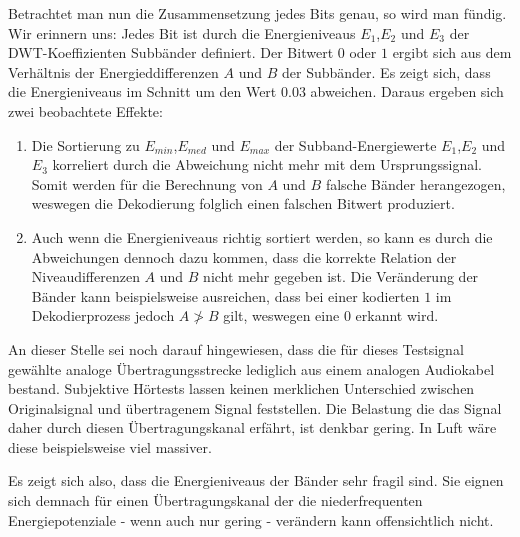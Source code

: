 Betrachtet man nun die Zusammensetzung jedes Bits genau, so wird man fündig. Wir erinnern uns: Jedes Bit ist durch die Energieniveaus ${E}_{1}$,${E}_{2}$ und ${E}_{3}$ der DWT-Koeffizienten Subbänder definiert. Der Bitwert $0$ oder $1$ ergibt sich aus dem Verhältnis der Energieddifferenzen $A$ und $B$ der Subbänder. Es zeigt sich, dass die Energieniveaus im Schnitt um den Wert $0.03$ abweichen. Daraus ergeben sich zwei beobachtete Effekte:

\begin{enumerate}
		
\item Die Sortierung zu ${E}_{min}$,${E}_{med}$ und ${E}_{max}$ der Subband-Energiewerte ${E}_{1}$,${E}_{2}$ und ${E}_{3}$ korreliert durch die Abweichung nicht mehr mit dem Ursprungssignal. Somit werden für die Berechnung von $A$ und $B$ falsche Bänder herangezogen, weswegen die Dekodierung folglich einen falschen Bitwert produziert. 
	
\item Auch wenn die Energieniveaus richtig sortiert werden, so kann es durch die Abweichungen dennoch dazu kommen, dass die korrekte Relation der Niveaudifferenzen $A$ und $B$ nicht mehr gegeben ist. Die Veränderung der Bänder kann beispielsweise ausreichen, dass bei einer kodierten $1$ im Dekodierprozess jedoch $A \ngtr B$ gilt, weswegen eine $0$ erkannt wird.
	
\end{enumerate}

An dieser Stelle sei noch darauf hingewiesen, dass die für dieses Testsignal gewählte analoge Übertragungsstrecke lediglich aus einem analogen Audiokabel bestand. Subjektive Hörtests lassen keinen merklichen Unterschied zwischen Originalsignal und übertragenem Signal feststellen. Die Belastung die das Signal daher durch diesen Übertragungskanal erfährt, ist denkbar gering. In Luft wäre diese beispielsweise viel massiver. 

Es zeigt sich also, dass die Energieniveaus der Bänder sehr fragil sind. Sie eignen sich demnach für einen Übertragungskanal der die niederfrequenten Energiepotenziale - wenn auch nur gering - verändern kann offensichtlich nicht. 